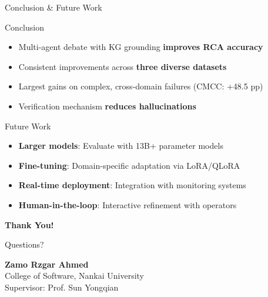 \documentclass[aspectratio=169]{beamer}
\begin{document}
\begin{frame}{Conclusion \& Future Work}
\begin{block}{Conclusion}
\begin{itemize}
    \item Multi-agent debate with KG grounding \textbf{improves RCA accuracy}
    \item Consistent improvements across \textbf{three diverse datasets}
    \item Largest gains on complex, cross-domain failures (CMCC: +48.5 pp)
    \item Verification mechanism \textbf{reduces hallucinations}
\end{itemize}
\end{block}

\vspace{0.5em}
\begin{block}{Future Work}
\begin{itemize}
    \item \textbf{Larger models}: Evaluate with 13B+ parameter models
    \item \textbf{Fine-tuning}: Domain-specific adaptation via LoRA/QLoRA
    \item \textbf{Real-time deployment}: Integration with monitoring systems
    \item \textbf{Human-in-the-loop}: Interactive refinement with operators
\end{itemize}
\end{block}
\end{frame}

\begin{frame}
\centering
\vspace{2em}
{\Huge \textbf{Thank You!}}

\vspace{2em}
{\Large Questions?}

\vspace{3em}
\textbf{Zamo Rzgar Ahmed}\\
College of Software, Nankai University\\
Supervisor: Prof. Sun Yongqian
\end{frame}
\end{document}
